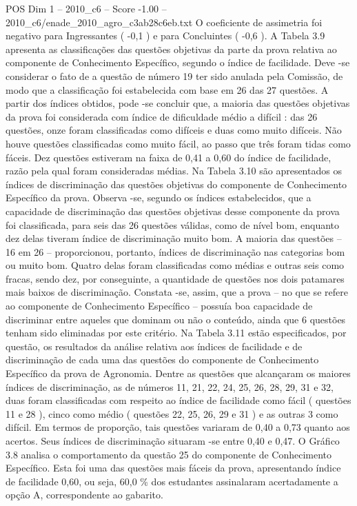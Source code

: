 \begin{textsample}{POS Dim 1 – 2010\_c6 – Score -1.00 – 2010\_c6/enade\_2010\_agro\_c3ab28c6eb.txt}
O coeficiente de assimetria foi negativo para Ingressantes ( -0,1 ) e para Concluintes ( -0,6 ).
A Tabela 3.9 apresenta as classificações das questões objetivas da parte da prova relativa ao componente de Conhecimento Específico, segundo o índice de facilidade.
Deve -se considerar o fato de a questão de número 19 ter sido anulada pela Comissão, de modo que a classificação foi estabelecida com base em 26 das 27 questões.
A partir dos índices obtidos, pode -se concluir que, a maioria das questões objetivas da prova foi considerada com índice de dificuldade médio a difícil : das 26 questões, onze foram classificadas como difíceis e duas como muito difíceis.
Não houve questões classificadas como muito fácil, ao passo que três foram tidas como fáceis.
Dez questões estiveram na faixa de 0,41 a 0,60 do índice de facilidade, razão pela qual foram consideradas médias.
Na Tabela 3.10 são apresentados os índices de discriminação das questões objetivas do componente de Conhecimento Específico da prova.
Observa -se, segundo os índices estabelecidos, que a capacidade de discriminação das questões objetivas desse componente da prova foi classificada, para seis das 26 questões válidas, como de nível bom, enquanto dez delas tiveram índice de discriminação muito bom.
A maioria das questões – 16 em 26 – proporcionou, portanto, índices de discriminação nas categorias bom ou muito bom.
Quatro delas foram classificadas como médias e outras seis como fracas, sendo dez, por conseguinte, a quantidade de questões nos dois patamares mais baixos de discriminação.
Constata -se, assim, que a prova – no que se refere ao componente de Conhecimento Específico – possuía boa capacidade de discriminar entre aqueles que dominam ou não o conteúdo, ainda que 6 questões tenham sido eliminadas por este critério.
Na Tabela 3.11 estão especificados, por questão, os resultados da análise relativa aos índices de facilidade e de discriminação de cada uma das questões do componente de Conhecimento Específico da prova de Agronomia.
Dentre as questões que alcançaram os maiores índices de discriminação, as de números 11, 21, 22, 24, 25, 26, 28, 29, 31 e 32, duas foram classificadas com respeito ao índice de facilidade como fácil ( questões 11 e 28 ), cinco como médio ( questões 22, 25, 26, 29 e 31 ) e as outras 3 como difícil.
Em termos de proporção, tais questões variaram de 0,40 a 0,73 quanto aos acertos.
Seus índices de discriminação situaram -se entre 0,40 e 0,47.
O Gráfico 3.8 analisa o comportamento da questão 25 do componente de Conhecimento Específico.
Esta foi uma das questões mais fáceis da prova, apresentando índice de facilidade 0,60, ou seja, 60,0 \% dos estudantes assinalaram acertadamente a opção A, correspondente ao gabarito.

\end{textsample}
